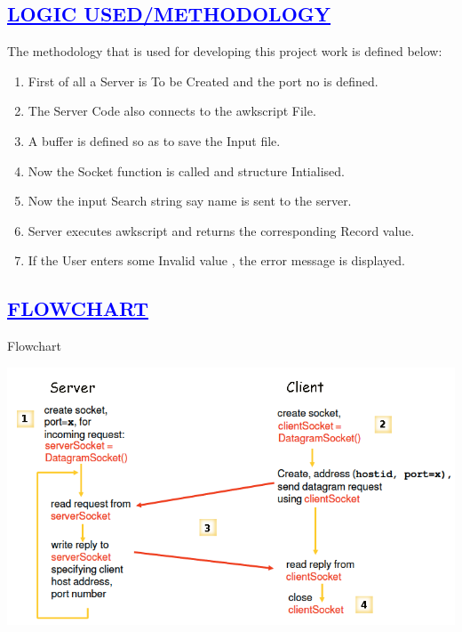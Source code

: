 \documentclass[a4paper,12pt]{report}
\begin{document}
\begin{center}
\chapter{\textcolor{blue}{\underline {LOGIC USED/METHODOLOGY}}}
\end{center}
The methodology that is used for developing this project work is defined below:
\begin{enumerate} 
\item First of all a Server is To be Created and the port no is defined.
\item The Server Code also connects to the awkscript File.
\item A buffer is defined so as to save the Input file.
\item Now the Socket function is called and structure Intialised.

\item Now the input Search string say name is sent to the server.
\item Server executes awkscript and returns the corresponding Record value.
\item If the User enters some Invalid value , the error message is displayed.
\end{enumerate}

\begin{center}
\chapter{\textcolor{blue}{\underline {FLOWCHART}}}
\end{center}
\noindent Flowchart\\
\begin{center}
 \includegraphics[width=12 cm,height=12 cm]{./client-server-udp.png}
\end{center}
\end{document}

